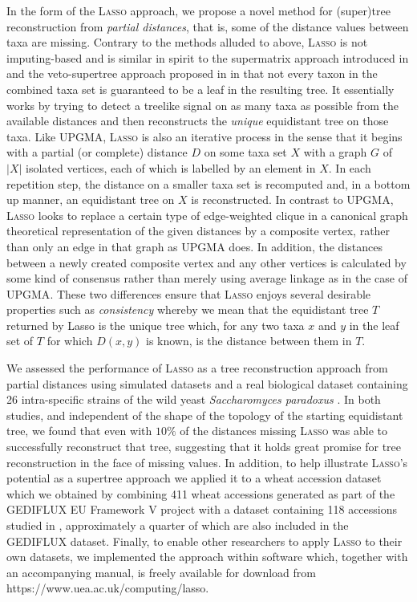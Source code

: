 In the form of the \textsc{Lasso} approach, we propose a novel method for
(super)tree reconstruction from {\em partial distances}, that is, some of the
distance values between taxa are missing. Contrary to the methods alluded to
above, \textsc{Lasso} is not imputing-based and is similar in spirit to the
supermatrix approach introduced in \cite{misof13selecting} and the
veto-supertree approach proposed in \cite{scorn08physic} in that not every
taxon in the combined taxa set is guaranteed to be a leaf in the resulting
tree. It essentially works by trying to detect a treelike signal on as many
taxa as possible from the available distances and then reconstructs the
\textit{unique} equidistant tree on those taxa.  Like {\sc UPGMA}, \textsc{Lasso}
is also an iterative process in the sense that it begins with a partial (or
complete) distance $D$ on some taxa set $X$ with a graph $G$ of $|X|$ isolated
vertices, each of which is labelled by an element in $X$. In each repetition
step, the distance on a smaller taxa set is recomputed and, in a bottom up
manner, an equidistant tree on $X$ is reconstructed. In contrast to {\sc
  UPGMA}, \textsc{Lasso} looks to replace a certain type of edge-weighted clique
in a canonical graph theoretical representation of the given distances by a
composite vertex, rather than only an edge in that graph as {\sc UPGMA}
does. In addition, the distances between a newly created composite vertex and
any other vertices is calculated by some kind of consensus rather than merely
using average linkage as in the case of {\sc UPGMA}.  These two differences
ensure that \textsc{Lasso} enjoys several desirable properties such as {\em
  consistency} whereby we mean that the equidistant tree $T$ returned by {\sc
  Lasso} is the unique tree which, for any two taxa $x$ and $y$ in the leaf
set of $T$ for which $D(x,y)$ is known, is the distance between them in $T$.

We assessed the performance of \textsc{Lasso} as a tree reconstruction approach
from partial distances using simulated datasets and a real biological dataset
containing 26 intra-specific strains of the wild yeast \textit{Saccharomyces
  paradoxus} \cite{west14ribosomal}.  In both studies, and independent of the
shape of the topology of the starting equidistant tree, we found that even
with $10\%$ of the distances missing \textsc{Lasso} was able to successfully
reconstruct that tree, suggesting that it holds great promise for tree
reconstruction in the face of missing values.  In addition, to help illustrate
\textsc{Lasso}'s potential as a supertree approach we applied it to a wheat
accession dataset which we obtained by combining 411 wheat accessions
generated as part of the GEDIFLUX EU Framework V project \cite{gediflux} with
a dataset containing 118 accessions studied in \cite{muge}, approximately a
quarter of which are also included in the GEDIFLUX dataset. Finally, to enable
other researchers to apply \textsc{Lasso} to their own datasets, we implemented
the approach within software which, together with an accompanying manual, is
freely available for download from https://www.uea.ac.uk/computing/lasso.

